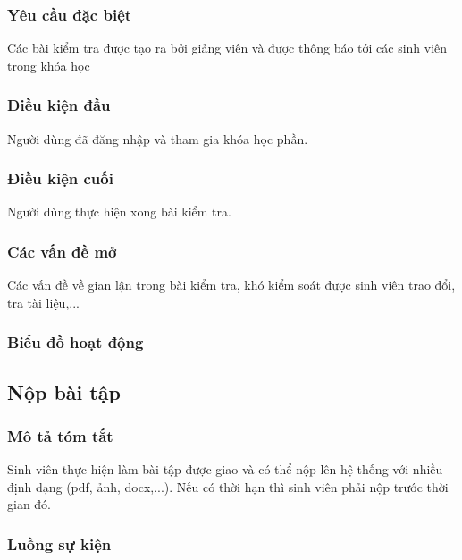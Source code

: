 \documentclass[./../main_file.tex]{subfiles}
\begin{document}
\subsubsection{Yêu cầu đặc biệt}
Các bài kiểm tra được tạo ra bởi giảng viên và được thông báo tới các sinh viên trong khóa học

\subsubsection{Điều kiện đầu}
Người dùng đã đăng nhập và tham gia khóa học phần.

\subsubsection{Điều kiện cuối}
Người dùng thực hiện xong bài kiểm tra.

\subsubsection{Các vấn đề mở}
Các vấn đề về gian lận trong bài kiểm tra, khó kiểm soát được sinh viên trao đổi, tra tài liệu,...

\subsubsection{Biểu đồ hoạt động}

\subsection{Nộp bài tập}
\subsubsection{Mô tả tóm tắt}
Sinh viên thực hiện làm bài tập được giao và có thể nộp lên hệ thống với nhiều định dạng (pdf, ảnh, docx,...). Nếu có thời hạn thì sinh viên phải nộp trước thời gian đó.

\subsubsection{Luồng sự kiện}
\end{document}
